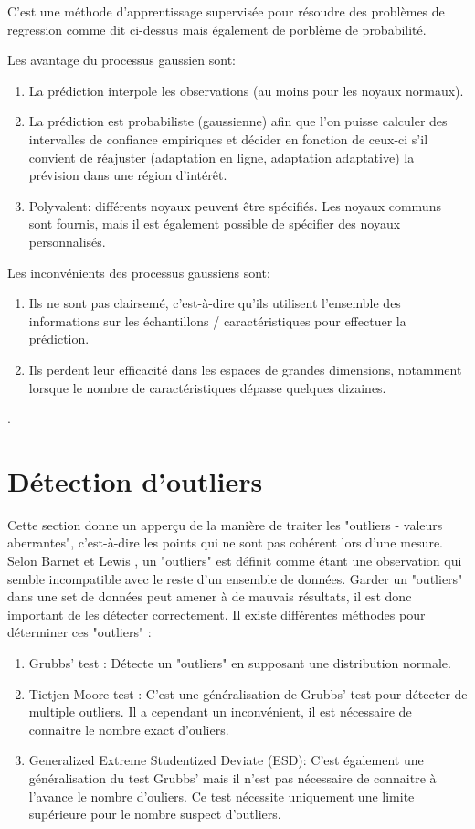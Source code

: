 C'est une méthode d'apprentissage supervisée pour résoudre des problèmes de regression comme dit ci-dessus mais également de porblème de probabilité. 

Les avantage du processus gaussien sont:

\begin{enumerate}
	\item La prédiction interpole les observations (au moins pour les noyaux normaux).
	\item La prédiction est probabiliste (gaussienne) afin que l’on puisse calculer des intervalles de confiance empiriques et décider en fonction de ceux-ci s’il convient de réajuster (adaptation en ligne, adaptation adaptative) la prévision dans une région d’intérêt.
	\item Polyvalent: différents noyaux peuvent être spécifiés. Les noyaux communs sont fournis, mais il est également possible de spécifier des noyaux personnalisés.
\end{enumerate}

Les inconvénients des processus gaussiens sont:

\begin{enumerate}
	\item Ils ne sont pas clairsemé, c’est-à-dire qu’ils utilisent l’ensemble des informations sur les échantillons / caractéristiques pour effectuer la prédiction.
	\item Ils perdent leur efficacité dans les espaces de grandes dimensions, notamment lorsque le nombre de caractéristiques dépasse quelques dizaines.
\end{enumerate}	
\cite{scikit}.	

\section{ Détection d'outliers \cite{ML_indoor}}
Cette section donne un apperçu de la manière de traiter les "outliers - valeurs aberrantes", c'est-à-dire les points qui ne sont pas cohérent lors d'une mesure. Selon Barnet et Lewis \cite{Outliers}, un "outliers" est définit comme étant une observation qui semble incompatible avec le reste d'un ensemble de données.
Garder un "outliers" dans une set de données peut amener à de mauvais résultats, il est donc important de les détecter correctement. Il existe différentes méthodes pour déterminer ces "outliers" :

\begin{enumerate}
	\item Grubbs' test : Détecte un "outliers" en supposant une distribution normale.
	\item Tietjen-Moore test : C'est une généralisation de Grubbs' test pour détecter de multiple outliers. Il a cependant un inconvénient, il est nécessaire de connaitre le nombre exact d'ouliers.
	\item Generalized Extreme Studentized Deviate (ESD): C'est également une généralisation du test Grubbs' mais il n'est pas nécessaire de connaitre à l'avance le nombre d'ouliers. Ce test nécessite uniquement une limite supérieure pour le nombre suspect d'outliers.\cite{ESD}
\end{enumerate}

